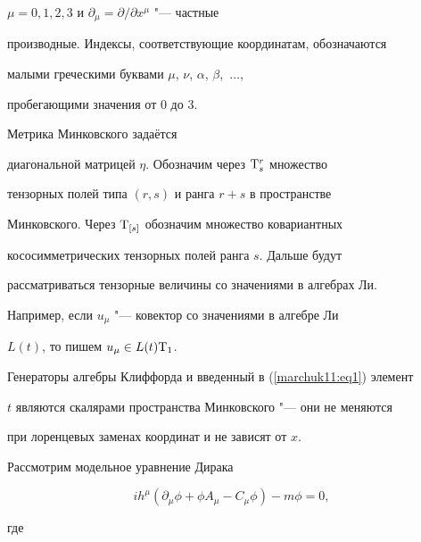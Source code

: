 $\mu=0, 1, 2, 3$ и $\partial_\mu=\partial/\partial x^\mu$ "--- частные

производные. Индексы, соответствующие координатам, обозначаются

малыми греческими буквами $\mu$,  $\nu$,  $\alpha$,  $\beta$,~$\ldots$,

пробегающими значения от 0 до 3. 

Метрика Минковского задаётся 

диагональной матрицей $\eta$. Обозначим через ${\rm T}^r_s$ множество

тензорных полей типа $(r, s)$ и ранга $r+s$ в пространстве

Минковского. Через ${\rm T}_{[s]}$ обозначим множество ковариантных

кососимметрических тензорных полей ранга $s$. Дальше будут

рассматриваться тензорные величины со значениями в алгебрах Ли.

Например,  если $u_\mu$ "--- ковектор со значениями в алгебре Ли

$L(t)$,  то пишем $u_\mu\in L(t){\rm T}_1$.



Генераторы алгебры Клиффорда и введенный в (\ref{marchuk11:eq1}) элемент

$t$ являются скалярами пространства Минковского "--- они не меняются

при лоренцевых заменах координат и не зависят от $x$.



Рассмотрим модельное уравнение Дирака \cite{marchuk11:2}

\begin{equation}

\label{marchuk11:eq3}

i h^\mu(\partial_\mu\phi+\phi A_\mu-C_\mu\phi)-m\phi=0, 

\end{equation}

где

